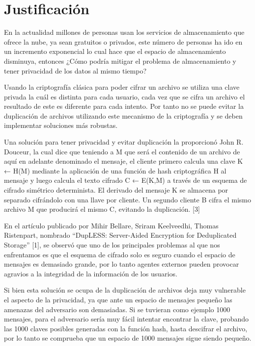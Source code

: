 \section{Justificación}

En la actualidad millones de personas usan los servicios de almacenamiento que ofrece la nube, ya sean gratuitos o privados, este número de personas ha ido en un incremento exponencial lo cual hace que el espacio de almacenamiento disminuya, entonces ¿Cómo podría mitigar el problema de almacenamiento y tener privacidad de los datos al mismo tiempo?

Usando la criptografía clásica para poder cifrar un archivo se utiliza una clave privada la cuál es distinta para cada usuario, cada vez que se cifra un archivo el resultado de este es diferente para cada intento. Por tanto no se puede evitar la duplicación de archivos utilizando este mecanismo de la criptografía y se deben implementar soluciones más robustas.

Una solución para tener privacidad y evitar duplicación la proporcionó John R. Douceur, la cual dice que teniendo a M que será el contenido de un archivo de aquí en adelante denominado el mensaje, el cliente primero calcula una clave K ← H(M) mediante la aplicación de una función de hash criptográfica H al mensaje y luego calcula el texto cifrado C ← E(K,M) a través de un esquema de cifrado simétrico determinista. El derivado del mensaje K se almacena por separado cifrándolo con una llave por cliente. Un segundo cliente B cifra el mismo archivo M que producirá el mismo C, evitando la duplicación. [3]

En el artículo publicado por Mihir Bellare, Sriram Keelveedhi, Thomas Ristenpart, nombrado “DupLESS: Server-Aided Encryption for Deduplicated Storage” [1], se observó que uno de los principales problemas al que nos enfrentamos es que el esquema de cifrado solo es seguro cuando el espacio de mensajes es demasiado grande, por lo tanto agentes externos pueden provocar agravios a la integridad de la información de los usuarios.

Si bien esta solución se ocupa de la duplicación de archivos deja muy vulnerable el aspecto de la privacidad, ya que ante un espacio de mensajes pequeño las amenazas del adversario son demasiadas. Si se tuvieran como ejemplo 1000 mensajes, para el adversario sería muy fácil intentar encontrar la clave, probando las 1000 claves posibles generadas con la función hash, hasta descifrar el archivo, por lo tanto se comprueba que un espacio de 1000 mensajes sigue siendo pequeño.

